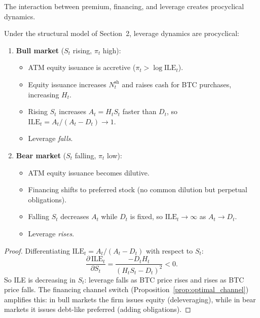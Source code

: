 The interaction between premium, financing, and leverage creates
procyclical dynamics.

\begin{proposition}
\label{prop:procyclical}
Under the structural model of Section~2, leverage dynamics are procyclical:
\begin{enumerate}
  \item \textbf{Bull market} ($S_t$ rising, $\pi_t$ high):
    \begin{itemize}
      \item ATM equity issuance is accretive ($\pi_t > \log\mathrm{ILE}_t$).
      \item Equity issuance increases $N_t^{\mathrm{sh}}$ and raises cash
        for BTC purchases, increasing $H_t$.
      \item Rising $S_t$ increases $A_t = H_t S_t$ faster than $D_t$,
        so $\mathrm{ILE}_t = A_t/(A_t - D_t) \to 1$.
      \item Leverage \emph{falls}.
    \end{itemize}

  \item \textbf{Bear market} ($S_t$ falling, $\pi_t$ low):
    \begin{itemize}
      \item ATM equity issuance becomes dilutive.
      \item Financing shifts to preferred stock (no common dilution
        but perpetual obligations).
      \item Falling $S_t$ decreases $A_t$ while $D_t$ is fixed,
        so $\mathrm{ILE}_t \to \infty$ as $A_t \to D_t$.
      \item Leverage \emph{rises}.
    \end{itemize}
\end{enumerate}
\end{proposition}

\begin{proof}
Differentiating $\mathrm{ILE}_t = A_t/(A_t - D_t)$ with respect to $S_t$:
\[
  \frac{\partial\,\mathrm{ILE}_t}{\partial S_t}
  = \frac{-D_t H_t}{(H_t S_t - D_t)^2} < 0.
\]
So ILE is decreasing in $S_t$: leverage falls as BTC price rises
and rises as BTC price falls. The financing channel switch
(Proposition~\ref{prop:optimal_channel}) amplifies this:
in bull markets the firm issues equity (deleveraging),
while in bear markets it issues debt-like preferred (adding obligations).
\end{proof}


